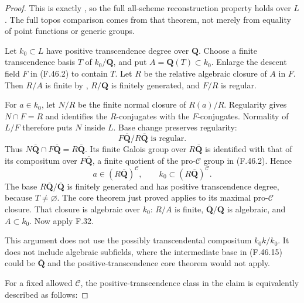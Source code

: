 \begin{proof}
This is exactly \citet[Theorem~4.18(5)]{F_CHW2024}, so the full all-scheme reconstruction
property holds over \(L\). The full topos comparison comes from that
theorem, not merely from equality of point functions or generic groups.


Let \(k_0\subset L\) have positive transcendence degree over
\(\mathbf Q\). Choose a finite transcendence basis \(T\) of
\(k_0/\mathbf Q\), and put \(A=\mathbf Q(T)\subset k_0\). Enlarge
the descent field \(F\) in \textup{(F.46.2)} to contain \(T\). Let \(R\) be the
relative algebraic closure of \(A\) in \(F\). Then \(R/A\) is finite by \citet[Lemma~9.26.11]{F_StacksFields},
\(R/\mathbf Q\) is finitely generated, and \(F/R\) is regular.

For \(a\in k_0\), let \(N/R\) be the finite normal closure of
\(R(a)/R\). Regularity gives \(N\cap F=R\) and identifies the
\(R\)-conjugates with the \(F\)-conjugates. Normality of \(L/F\)
therefore puts \(N\) inside \(L\). Base change preserves regularity:
\[
    F\overline{\mathbf Q}/R\overline{\mathbf Q}
                       \text{ is regular}.
\]
Thus \(N\overline{\mathbf Q}\cap F\overline{\mathbf Q}
=R\overline{\mathbf Q}\). Its finite Galois group over
\(R\overline{\mathbf Q}\) is identified with that of its compositum
over \(F\overline{\mathbf Q}\), a finite quotient of the
pro-\(\mathcal C\) group in \textup{(F.46.2)}. Hence
\[
        a\in (R\overline{\mathbf Q})^{\mathcal C},
          \qquad k_0\subset (R\overline{\mathbf Q})^{\mathcal C}.
                                                               \tag{F.46.15}
\]
The base \(R\overline{\mathbf Q}/\overline{\mathbf Q}\) is finitely
generated and has positive transcendence degree, because \(T\ne\varnothing\).
The core theorem just proved applies to its maximal
pro-\(\mathcal C\) closure. That closure is algebraic over \(k_0\):
\(R/A\) is finite, \(\overline{\mathbf Q}/\mathbf Q\) is algebraic,
and \(A\subset k_0\). Now apply F.32.

This argument does not use the possibly transcendental compositum
\(k_0k/k_0\). It does not include algebraic subfields, where the
intermediate base in \textup{(F.46.15)} could be \(\overline{\mathbf Q}\) and the
positive-transcendence core theorem would not apply.


For a fixed allowed \(\mathcal C\), the positive-transcendence class in
the claim is equivalently described as follows:


\end{proof}
